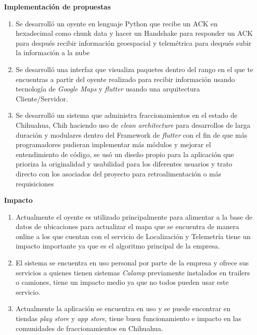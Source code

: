 \documentclass[protocolo.tex]{subfiles}
\begin{document}
\textbf{Implementación de propuestas}
\begin{enumerate}
\item Se desarrolló un oyente en lenguaje Python que recibe un ACK en hexadecimal como
chunk data y hacer un Handshake para responder un ACK para después recibir información
geoespacial y telemétrica para después subir la información a la nube

\item Se desarrolló una interfaz que visualiza paquetes dentro del rango en el que te
encuentras a partir del oyente realizado para recibir información usando tecnología de
\textit{Google Maps} y \textit{flutter} usando una arquitectura Cliente/Servidor.

\item Se desarrolló un sistema que administra fraccionamientos en el estado de Chihuahua,
Chih haciendo uso de \textit{clean architecture} para desarrollos de larga duración y modulares
dentro del Framework de \textit{flutter} con el fin de que más programadores pudieran
implementar más módulos y mejorar el entendimiento de código, se usó un diseño propio
para la aplicación que prioriza la originalidad y usabilidad para los diferentes usuarios y
trato directo con los asociados del proyecto para retroalimentación o más requisiciones
\end{enumerate}

\textbf{Impacto}
\begin{enumerate}
\item Actualmente el oyente es utilizado principalmente para alimentar a la base de datos de
ubicaciones para actualizar el mapa que se encuentra de manera online a los que cuentan
con el servicio de Localización y Telemetría tiene un impacto importante ya que es el
algoritmo principal de la empresa.

\item El sistema se encuentra en uso personal por parte de la empresa y ofrece sus servicios a
quienes tienen sistemas \textit{Calamp} previamente instalados en trailers o camiones, tiene un
impacto medio ya que no todos pueden usar este servicio.

\item Actualmente la aplicación se encuentra en uso y se puede encontrar en tiendas \textit{play
store} y \textit{app store}, tiene buen funcionamiento e impacto en las comunidades de
fraccionamientos en Chihuahua.

\end{enumerate}
\end{document}
